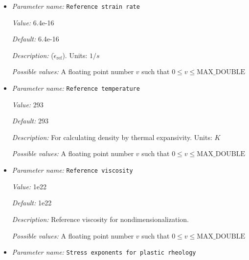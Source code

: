 \begin{itemize}
{\it Value:} 1.24e14


{\it Default:} 1.24e14


{\it Description:} ($B$). Units: None


{\it Possible values:} A floating point number $v$ such that $0 \leq v \leq \text{MAX\_DOUBLE}$
\item {\it Parameter name:} {\tt Reference strain rate}
\label{parameters:Material model/Morency and Doin/Reference strain rate}


{\it Value:} 6.4e-16


{\it Default:} 6.4e-16


{\it Description:} ($\dot{\epsilon}_\text{ref}$). Units: $1 / s$


{\it Possible values:} A floating point number $v$ such that $0 \leq v \leq \text{MAX\_DOUBLE}$
\item {\it Parameter name:} {\tt Reference temperature}
\label{parameters:Material model/Morency and Doin/Reference temperature}


{\it Value:} 293


{\it Default:} 293


{\it Description:} For calculating density by thermal expansivity. Units: $K$


{\it Possible values:} A floating point number $v$ such that $0 \leq v \leq \text{MAX\_DOUBLE}$
\item {\it Parameter name:} {\tt Reference viscosity}
\label{parameters:Material model/Morency and Doin/Reference viscosity}


{\it Value:} 1e22


{\it Default:} 1e22


{\it Description:} Reference viscosity for nondimensionalization.


{\it Possible values:} A floating point number $v$ such that $0 \leq v \leq \text{MAX\_DOUBLE}$
\item {\it Parameter name:} {\tt Stress exponents for plastic rheology}
\label{parameters:Material model/Morency and Doin/Stress exponents for plastic rheology}



\end{itemize}
